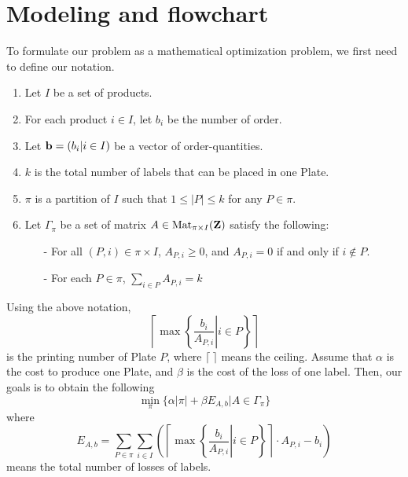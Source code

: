 \documentclass[a4paper]{amsart}
\numberwithin{equation}{section} %
\numberwithin{figure}{section} %
\numberwithin{table}{section}
\theoremstyle{plain}
\theoremstyle{definition}
\theoremstyle{plain}
\theoremstyle{plain}
\theoremstyle{plain}
\theoremstyle{plain}
\theoremstyle{plain}
\begin{document}
\section{Modeling and flowchart}\label{sec:Modeling}
To formulate our problem as a mathematical optimization problem, we first need to define our notation.
\begin{enumerate}[$\bullet$]
	\item Let $I$ be a set of products.
	\item For each product $i \in I$, let $b_{i}$ be the number of order.
	\item Let ${\bf b}=(b_{i}|i \in I)$ be a vector of order-quantities.
	\item $k$ is the total number of labels that can be placed in one Plate.
	\item $\pi$ is a partition of $I$ such that $1 \leq  |P| \leq k$ for any $P \in \pi$. 
	\item Let $\Gamma_{\pi}$ be a set of matrix $A \in {\rm Mat}_{\pi \times I}(\mathbf{Z})$ satisfy the following:
	\begin{itemize}
		\item[-] For all $(P,i) \in \pi \times I$, $A_{P,i} \geq 0$, and $A_{P,i} = 0$ if and only if $i \notin P$.
		\item[-] For each $P \in \pi$, $\sum_{i \in P}A_{P, i} = k$
\end{itemize}
\end{enumerate}

Using the above notation,
\begin{equation}\label{eq:NumPlate}
	\left\lceil \max \left\{ \left.\frac{b_{i}}{A_{P,i}}\right|i \in P \right\} \right\rceil
\end{equation}
is the printing number of Plate $P$, where $\lceil~\rceil$ means the ceiling. 
Assume that $\alpha$ is the cost to produce one Plate, and $\beta$ is the cost of the loss of one label. 
Then, our goals is to obtain the following 
\begin{equation}\label{eq:TotalCost}
	\min_{\pi} \{ \alpha|\pi| + \beta E_{A,b} | A \in \Gamma_{\pi} \}
\end{equation}
where
\begin{equation}\label{eq:TotalLoss}
	E_{A,b} = \sum_{P \in \pi} \sum_{i \in I} \left( \left\lceil \max \left\{ \left.\frac{b_{i}}{A_{P,i}}\right|i \in P \right\} \right\rceil \cdot A_{P,i} - b_{i} \right)
\end{equation}
means the total number of losses of labels.
\end{document}
